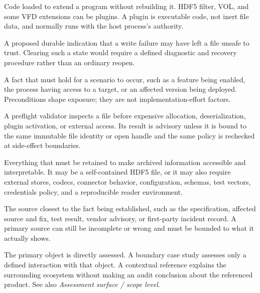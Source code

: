 \documentclass[../main.tex]{subfiles}
\begin{document}
\begin{description}[leftmargin=1.5em,style=nextline]
\item[Plugin.]
Code loaded to extend a program without rebuilding it. HDF5 filter, VOL, and
some VFD extensions can be plugins. A plugin is executable code, not inert
file data, and normally runs with the host process's authority.

\item[Poisoned or suspect file state.]
A proposed durable indication that a write failure may have left a file unsafe
to trust. Clearing such a state would require a defined diagnostic and recovery
procedure rather than an ordinary reopen.

\item[Precondition.]
A fact that must hold for a scenario to occur, such as a feature being enabled,
the process having access to a target, or an affected version being deployed.
Preconditions shape exposure; they are not implementation-effort factors.

\item[Preflight validator / enforcement coupling.]
A preflight validator inspects a file before expensive allocation,
deserialization, plugin activation, or external access. Its result is advisory
unless it is bound to the same immutable file identity or open handle and the
same policy is rechecked at side-effect boundaries.

\item[Preservation object.]
Everything that must be retained to make archived information accessible and
interpretable. It may be a self-contained HDF5 file, or it may also require
external stores, codecs, connector behavior, configuration, schemas, test
vectors, credentials policy, and a reproducible reader environment.

\item[Primary artifact / primary evidence.]
The source closest to the fact being established, such as the specification,
affected source and fix, test result, vendor advisory, or first-party incident
record. A primary source can still be incomplete or wrong and must be bounded
to what it actually shows.

\item[Primary assessment object / boundary case study / contextual reference.]
The primary object is directly assessed. A boundary case study assesses only a
defined interaction with that object. A contextual reference explains the
surrounding ecosystem without making an audit conclusion about the referenced
product. See also \emph{Assessment surface / scope level}.


\end{description}
\end{document}
